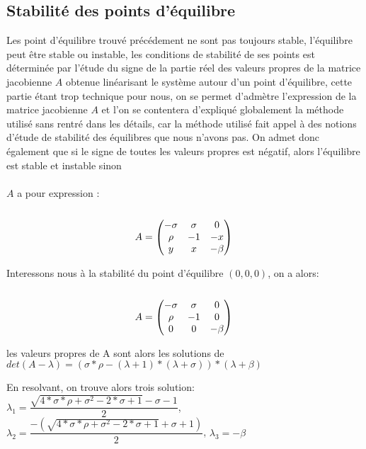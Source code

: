 \subsection{Stabilité des points d'équilibre}
Les point d'équilibre trouvé précédement ne sont pas toujours stable, l'équilibre peut être stable ou instable, les conditions de stabilité de ses points est déterminée par l'étude du signe de la partie réel des valeurs propres de la matrice jacobienne $A$ obtenue linéarisant le système autour d'un point d'équilibre, cette partie étant trop technique pour nous, on se permet d'admètre l'expression de la matrice jacobienne $A$ et l'on se contentera d'expliqué globalement la méthode utilisé sans rentré dans les détails, car la méthode utilisé fait appel à des notions d'étude de stabilité des équilibres que nous n'avons pas. On admet donc également que si le signe de toutes les valeurs propres est négatif, alors l'équilibre est stable et instable sinon \\\\ 
$A$ a pour expression :\\\\
$$A=\begin{pmatrix}
    -\sigma & \sigma & 0\\
    \rho & -1 & -x\\
       y & x & -\beta 
\end{pmatrix}\\\\$$

Interessons nous à la stabilité du point d'équilibre $(0,0,0)$, on a alors:\\\\
$$A=\begin{pmatrix}
    -\sigma & \sigma & 0\\
    \rho & -1 & 0\\
       0 & 0 & -\beta 
\end{pmatrix}\\\\$$

les valeurs propres de A sont alors les solutions de
 $det(A-\lambda)=(\sigma*\rho-(\lambda+1)*(\lambda+\sigma))*(\lambda+\beta) $

 En resolvant, on trouve alors trois solution: $\lambda_{1}=\dfrac{\sqrt{4*\sigma*\rho+\sigma^2-2*\sigma+1}-\sigma-1}{2}$, $\lambda_{2}=\dfrac{-(\sqrt{4*\sigma*\rho+\sigma^2-2*\sigma+1}+\sigma+1)}{2}$, $\lambda_{3}=-\beta$\\\\

